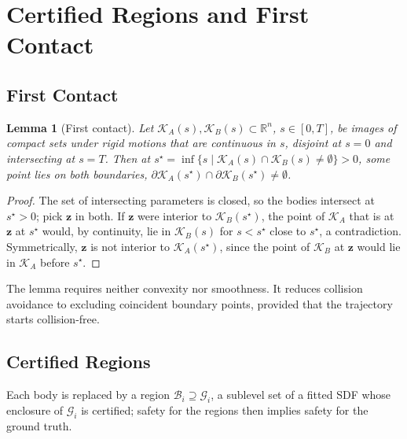 \documentclass[journal]{IEEEtran}
\newtheorem{lemma}{Lemma}
\theoremstyle{definition}
\newcommand{\R}{\mathbb{R}}
\begin{document}
\section{Certified Regions and First Contact}\label{sec:regions}

\subsection{First Contact}
\begin{lemma}[First contact]\label{lem:contact}
Let $\mathcal K_A(s),\mathcal K_B(s)\subset\R^n$, $s\in[0,T]$, be images of compact sets under rigid
motions that are continuous in $s$, disjoint at $s=0$ and intersecting at $s=T$. Then at
$s^\star=\inf\{s\mid\mathcal K_A(s)\cap\mathcal K_B(s)\neq\emptyset\}>0$, some point lies on both
boundaries, $\partial\mathcal K_A(s^\star)\cap\partial\mathcal K_B(s^\star)\neq\emptyset$.
\end{lemma}
\begin{proof}
The set of intersecting parameters is closed, so the bodies intersect at $s^\star>0$; pick $\mathbf z$
in both. If $\mathbf z$ were interior to $\mathcal K_B(s^\star)$, the point of $\mathcal K_A$ that
is at $\mathbf z$ at $s^\star$ would, by continuity, lie in $\mathcal K_B(s)$ for $s<s^\star$ close
to $s^\star$, a contradiction. Symmetrically, $\mathbf z$ is not interior to $\mathcal K_A(s^\star)$,
since the point of $\mathcal K_B$ at $\mathbf z$ would lie in $\mathcal K_A$ before $s^\star$.
\end{proof}
The lemma requires neither convexity nor smoothness. It reduces collision avoidance to excluding
coincident boundary points, provided that the trajectory starts collision-free.

\subsection{Certified Regions}\label{sec:cert-body}
Each body is replaced by a region $\mathcal B_i\supseteq\mathcal G_i$, a sublevel set of a fitted SDF
whose enclosure of $\mathcal G_i$ is certified; safety for the regions then implies safety for the
ground truth.
\end{document}
